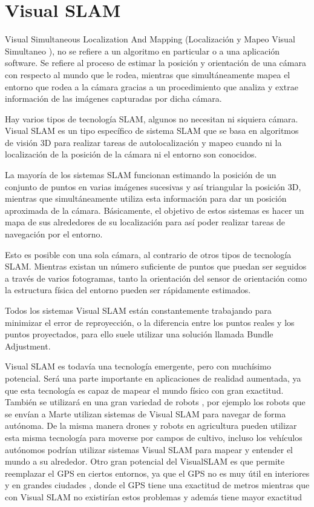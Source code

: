 \section{Visual SLAM}

Visual Simultaneous Localization And Mapping (Localización y Mapeo Visual Simultaneo ), no se refiere a un algoritmo en particular o a una aplicación software. Se refiere al proceso de estimar la posición y orientación de una cámara con respecto al mundo que le rodea, mientras que simultáneamente mapea el entorno que rodea a la cámara gracias a un procedimiento que analiza y extrae información de las imágenes capturadas por dicha cámara.

Hay varios tipos de tecnología SLAM, algunos no necesitan ni siquiera cámara. Visual SLAM es un tipo específico de sistema SLAM que se basa en algoritmos de visión 3D
para realizar tareas de autolocalización y mapeo cuando ni la localización de la posición de la cámara ni el entorno son conocidos.

La mayoría de los sistemas SLAM funcionan estimando la posición de un conjunto de puntos en varias imágenes sucesivas y así triangular la posición 3D, mientras que simultáneamente utiliza esta información para dar un posición aproximada de la cámara. Básicamente, el objetivo de estos sistemas es hacer un mapa de sus alrededores de su localización para así poder realizar tareas de navegación por el entorno.

Esto es posible con una sola cámara, al contrario de otros tipos de tecnología SLAM. Mientras existan un número suficiente de puntos que puedan ser seguidos a través de varios fotogramas, tanto la orientación del sensor de orientación como la estructura física del entorno pueden ser rápidamente estimados.

Todos los sistemas Visual SLAM están constantemente trabajando para minimizar el error de reproyección, o la diferencia entre los puntos reales y los puntos proyectados, para ello suele utilizar una solución llamada Bundle Adjustment.

Visual SLAM es todavía una tecnología emergente, pero con muchísimo potencial. Será una parte importante en aplicaciones de realidad aumentada, ya que esta tecnología es capaz de mapear el mundo físico con gran exactitud. También se utilizará en una gran variedad de robots , por ejemplo los robots que se envían a Marte utilizan sistemas de Visual SLAM para navegar de forma autónoma. De la misma manera drones y robots en agricultura pueden utilizar esta misma tecnología para moverse por campos de cultivo, incluso los vehículos autónomos podrían utilizar sistemas Visual SLAM para mapear y entender el mundo a su alrededor. Otro gran potencial del VisualSLAM es que permite reemplazar el GPS en ciertos entornos, ya que el GPS no es muy útil en interiores y en grandes ciudades , donde el GPS tiene una exactitud de metros mientras que con Visual SLAM no existirían estos problemas y además tiene mayor exactitud



